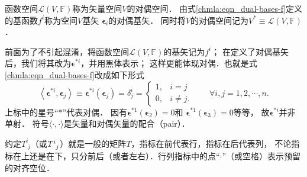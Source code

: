 \begin{definition}\label{chmla:def_dual-space}
    函数空间$\mathscr{L}(V,\mathbb{F})$称为矢量空间$V$的{\heiti 对偶空间}．
    由式\eqref{chmla:eqn_dual-bases-f}定义的基函数$f^i$称为空间$V$基矢
    $\boldsymbol{\epsilon}_i$的{\heiti 对偶基矢}．
    同时将$V$的对偶空间记为$V^* \equiv \mathscr{L}(V,\mathbb{F})$．
\end{definition}

\begin{remark}\label{chmla:rem_inj11}
    前面为了不引起混淆，将函数空间$\mathscr{L}(V,\mathbb{F})$的基矢记为$f^i$；
    在定义了对偶基矢后，我们将其改为$\boldsymbol{\epsilon}^{*i}$，并用黑体表示；
    这样更能体现{\kaishu  对偶}．也就是式\eqref{chmla:eqn_dual-bases-f}改成如下形式
\begin{equation} \label{chmla:eqn_dual-bases}
    \left< \boldsymbol{\epsilon}^{*i}, \boldsymbol{\epsilon}_j \right>
    \equiv \boldsymbol{\epsilon}^{*i}(\boldsymbol{\epsilon}_j) =
    \delta^i _j =
    \begin{cases}
        1,& i=j \\ 0, & i\neq j.
    \end{cases}
    \qquad \forall i,j = 1,2,\cdots,n.
\end{equation}
上标中的星号“$*$”代表{\kaishu 对偶}．
因有$\boldsymbol{\epsilon}^{*1}(\boldsymbol{\epsilon}_2)=0$和
$\boldsymbol{\epsilon}^{*1}(\boldsymbol{\epsilon}_3)=0$等等，
故$\boldsymbol{\epsilon}^{*i}$并非单射．
符号$\langle \cdot,\cdot\rangle$是矢量和对偶矢量的{\heiti 配合}（pair）．
\end{remark}

\begin{remark}\label{chmla:remark_matrixij}
    约定$T^{i}_{\cdot j}$（或$T^{i}_{\hphantom{a} j}$）就是一般的矩阵$T$，指标在前代表行，指标在后代表列，
    不论指标在上还是在下，只分前后（或者左右）．行列指标中的点“$\cdot$”（或空格）表示预留的对齐空位．
\end{remark}

